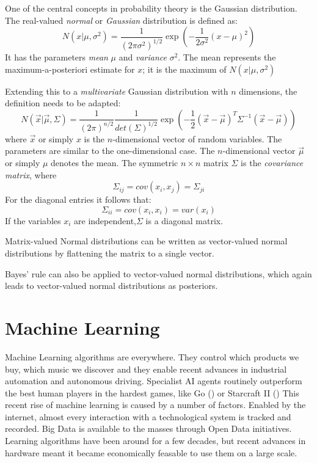 \documentclass[twoside,12pt,a4paper]{report}
\begin{document}
One of the central concepts in probability theory is the Gaussian distribution.
The real-valued \textit{normal} or \textit{Gaussian} distribution is defined as:
$$N(x | \mu, \sigma^2) = \frac{1}{(2\pi \sigma^2)^{1/2}} \exp\left(- \frac{1}{2\sigma^2} (x-\mu)^2 \right)$$
It has the parameters \textit{mean} $\mu$ and \textit{variance} $\sigma ^2$.
The mean represents the maximum-a-posteriori estimate for $x$; it is the maximum of $N(x | \mu, \sigma^2)$

Extending this to a \textit{multivariate} Gaussian distribution with $n$ dimensions, the definition needs to be adapted:
$$N(\vec{x} | \vec{\mu}, \Sigma) = \frac{1}{(2\pi)^{n/2}} \frac{1}{det(\Sigma)^{1/2}} \exp\left(-\frac{1}{2} (\vec{x} - \vec{\mu})^T \Sigma ^{-1} (\vec{x} - \vec{\mu})\right)$$
where $\vec{x}$ or simply $x$ is the $n$-dimensional vector of random variables. The parameters are similar to the one-dimensional case. The $n$-dimensional vector $\vec{\mu}$ or simply $\mu$ denotes the mean. The symmetric $n \times n$ matrix $\Sigma$ is the \textit{covariance matrix}, where
$$ \Sigma_{ij} =  cov(x_i, x_j) = \Sigma_{ji}$$
For the diagonal entries it follows that:
$$\Sigma_{ii} = cov(x_i,x_i) = var(x_i)$$
If the variables $x_i$ are independent,$\Sigma$ is a diagonal matrix.

Matrix-valued Normal distributions can be written as vector-valued normal distributions by flattening the matrix to a single vector.

Bayes' rule can also be applied to vector-valued normal distributions, which again leads to vector-valued normal distributions as posteriors.

\section{Machine Learning}
Machine Learning algorithms are everywhere. They control which products we buy, which music we discover and they enable recent advances in industrial automation and autonomous driving. Specialist AI agents routinely outperform the best human players in the hardest games, like Go (\cite{gibney2016google}) or Starcraft II (\cite{vinyals2019alphastar})
This recent rise of machine learning is caused by a number of factors. Enabled by the internet, almost every interaction with a technological system is tracked and recorded. Big Data is available to the masses through Open Data initiatives.
Learning algorithms have been around for a few decades, but recent advances in hardware meant it became economically feasable to use them on a large scale.
\end{document}
